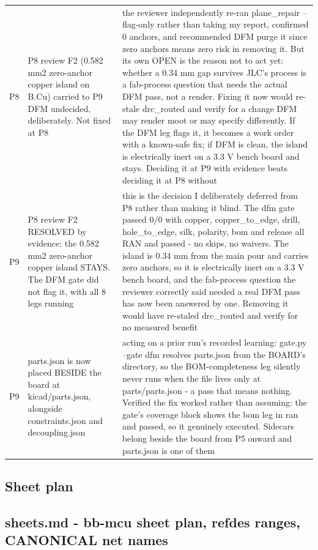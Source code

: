 \documentclass[11pt,a4paper]{article}
\begin{document}
{\begin{longtable}{lp{5.2cm}p{7.2cm}}
P8 & P8 review F2 (0.582 mm2 zero-anchor copper island on B.Cu) carried to P9 DFM undecided, deliberately. Not fixed at P8 & the reviewer independently re-ran plane\_repair --flag-only rather than taking my report, confirmed 0 anchors, and recommended DFM purge it since zero anchors means zero risk in removing it. But its own OPEN is the reason not to act yet: whether a 0.34 mm gap survives JLC's process is a fab-process question that needs the actual DFM pass, not a render. Fixing it now would re-stale drc\_routed and verify for a change DFM may render moot or may specify differently. If the DFM leg flags it, it becomes a work order with a known-safe fix; if DFM is clean, the island is electrically inert on a 3.3 V bench board and stays. Deciding it at P9 with evidence beats deciding it at P8 without \\
P9 & P8 review F2 RESOLVED by evidence: the 0.582 mm2 zero-anchor copper island STAYS. The DFM gate did not flag it, with all 8 legs running & this is the decision I deliberately deferred from P8 rather than making it blind. The dfm gate passed 0/0 with copper, copper\_to\_edge, drill, hole\_to\_edge, silk, polarity, bom and release all RAN and passed - no skips, no waivers. The island is 0.34 mm from the main pour and carries zero anchors, so it is electrically inert on a 3.3 V bench board, and the fab-process question the reviewer correctly said needed a real DFM pass has now been answered by one. Removing it would have re-staled drc\_routed and verify for no measured benefit \\
P9 & parts.json is now placed BESIDE the board at kicad/parts.json, alongside constraints.json and decoupling.json & acting on a prior run's recorded learning: gate.py --gate dfm resolves parts.json from the BOARD's directory, so the BOM-completeness leg silently never runs when the file lives only at parts/parts.json - a pass that means nothing. Verified the fix worked rather than assuming: the gate's coverage block shows the bom leg in ran and passed, so it genuinely executed. Sidecars belong beside the board from P5 onward and parts.json is one of them \\
\bottomrule
\end{longtable}
}
\subsection*{Sheet plan}
\subsection*{sheets.md - bb-mcu sheet plan, refdes ranges, CANONICAL net names}
\end{document}
